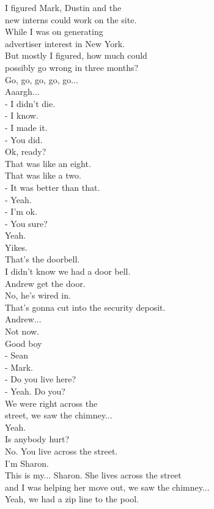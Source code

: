 \documentclass{article}
\begin{document}
\begin{multicols}{3}
I figured Mark, Dustin and the\\
new interns could work on the site.\\
While I was on generating\\
advertiser interest in New York.\\
But mostly I figured, how much could\\
possibly go wrong in three months?\\
Go, go, go, go, go...\\
Aaargh...\\
- I didn't die.\\
- I know.\\
- I made it.\\
- You did.\\
Ok, ready?\\
That was like an eight.\\
That was like a two.\\
- It was better than that.\\
- Yeah.\\
- I'm ok.\\
- You sure?\\
Yeah.\\
Yikes.\\
That's the doorbell.\\
I didn't know we had a door bell.\\
Andrew get the door.\\
No, he's wired in.\\
That's gonna cut into the security deposit.\\
Andrew...\\
Not now.\\
Good boy\\
- Sean\\
- Mark.\\
- Do you live here?\\
- Yeah. Do you?\\
We were right across the\\
street, we saw the chimney...\\
Yeah.\\
Is anybody hurt?\\
No. You live across the street.\\
I'm Sharon.\\
This is my... Sharon. She lives across the street\\
and I was helping her move out, we saw the chimney...\\
Yeah, we had a zip line to the pool.\\

\end{multicols}
\end{document}

